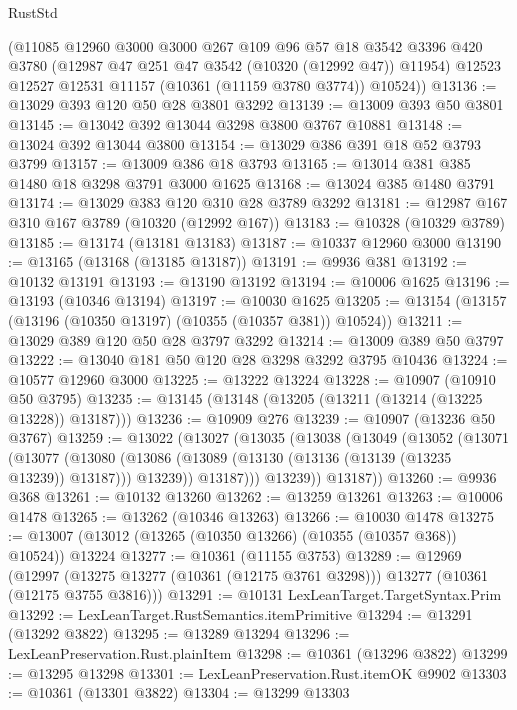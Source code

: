 \begin{lexlean}{RustStd}
\begin{coremodule}
      (@11085
        @12960
        @3000
        @3000
        @267
        @109
        @96
        @57
        @18
        @3542
        @3396
        @420
        @3780
        (@12987 @47 @251 @47 @3542 (@10320 (@12992 @47)) @11954)
        @12523
        @12527
        @12531
        @11157
        (@10361 (@11159 @3780 @3774))
        @10524))
@13136 := @13029 @393 @120 @50 @28 @3801 @3292
@13139 := @13009 @393 @50 @3801
@13145 := @13042 @392 @13044 @3298 @3800 @3767 @10881
@13148 := @13024 @392 @13044 @3800
@13154 := @13029 @386 @391 @18 @52 @3793 @3799
@13157 := @13009 @386 @18 @3793
@13165 := @13014 @381 @385 @1480 @18 @3298 @3791 @3000 @1625
@13168 := @13024 @385 @1480 @3791
@13174 := @13029 @383 @120 @310 @28 @3789 @3292
@13181 := @12987 @167 @310 @167 @3789 (@10320 (@12992 @167))
@13183 := @10328 (@10329 @3789)
@13185 := @13174 (@13181 @13183)
@13187 := @10337 @12960 @3000
@13190 := @13165 (@13168 (@13185 @13187))
@13191 := @9936 @381
@13192 := @10132 @13191
@13193 := @13190 @13192
@13194 := @10006 @1625
@13196 := @13193 (@10346 @13194)
@13197 := @10030 @1625
@13205 := @13154 (@13157 (@13196 (@10350 @13197) (@10355 (@10357 @381)) @10524))
@13211 := @13029 @389 @120 @50 @28 @3797 @3292
@13214 := @13009 @389 @50 @3797
@13222 := @13040 @181 @50 @120 @28 @3298 @3292 @3795 @10436
@13224 := @10577 @12960 @3000
@13225 := @13222 @13224
@13228 := @10907 (@10910 @50 @3795)
@13235 := @13145 (@13148 (@13205 (@13211 (@13214 (@13225 @13228)) @13187)))
@13236 := @10909 @276
@13239 := @10907 (@13236 @50 @3767)
@13259 := @13022
    (@13027
      (@13035
        (@13038
          (@13049
            (@13052
              (@13071
                (@13077
                  (@13080
                    (@13086 (@13089 (@13130 (@13136 (@13139 (@13235 @13239)) @13187))) @13239))
                  @13187)))
            @13239))
        @13187))
@13260 := @9936 @368
@13261 := @10132 @13260
@13262 := @13259 @13261
@13263 := @10006 @1478
@13265 := @13262 (@10346 @13263)
@13266 := @10030 @1478
@13275 := @13007 (@13012 (@13265 (@10350 @13266) (@10355 (@10357 @368)) @10524)) @13224
@13277 := @10361 (@11155 @3753)
@13289 := @12969
    (@12997 (@13275 @13277 (@10361 (@12175 @3761 @3298))) @13277 (@10361 (@12175 @3755 @3816)))
@13291 := @10131 LexLeanTarget.TargetSyntax.Prim
@13292 := LexLeanTarget.RustSemantics.itemPrimitive
@13294 := @13291 (@13292 @3822)
@13295 := @13289 @13294
@13296 := LexLeanPreservation.Rust.plainItem
@13298 := @10361 (@13296 @3822)
@13299 := @13295 @13298
@13301 := LexLeanPreservation.Rust.itemOK @9902
@13303 := @10361 (@13301 @3822)
@13304 := @13299 @13303

\end{coremodule}
\end{lexlean}
